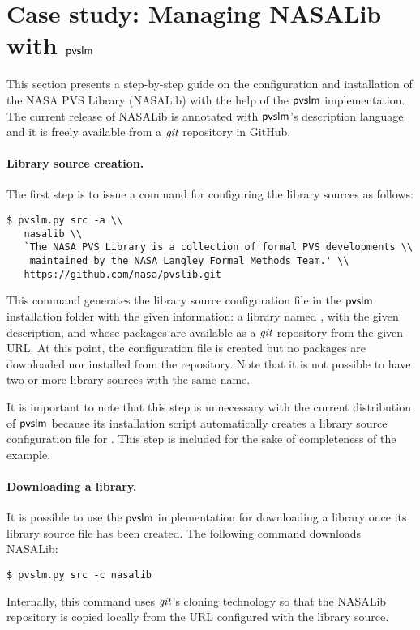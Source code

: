 \section{Case study: Managing NASALib with $\textsf{pvslm}$}
\label{sec.nasalib}

This section presents a step-by-step guide on the configuration and
installation of the NASA PVS Library (NASALib) with the help of the
$\textsf{pvslm}$ implementation. The current release of NASALib is annotated
with $\textsf{pvslm}$'s description language and it is freely available from a
$\textit{git}$ repository in GitHub.

\paragraph{Library source creation.}
The first step is to issue a command for configuring the library sources
as follows:
%
{\small\begin{verbatim}
$ pvslm.py src -a \\
   nasalib \\
   `The NASA PVS Library is a collection of formal PVS developments \\
    maintained by the NASA Langley Formal Methods Team.' \\
   https://github.com/nasa/pvslib.git
\end{verbatim}}
%
\noindent This command generates the library source configuration file
in the $\textsf{pvslm}$ installation folder with the given information: a
library named , with the given description, and whose
packages are available as a $\textit{git}$ repository from the given URL. At
this point, the configuration file is created but no packages are
downloaded nor installed from the repository. Note that it is not
possible to have two or more library sources with the same name.

It is important to note that this step is unnecessary with the current
distribution of $\textsf{pvslm}$ because its installation script automatically
creates a library source configuration file for . This
step is included for the sake of completeness of the example.

\paragraph{Downloading a library.} It is possible to use the $\textsf{pvslm}$
implementation for downloading a library once its library source file
has been created. The following command downloads NASALib:
%
\begin{verbatim}
$ pvslm.py src -c nasalib
\end{verbatim}
%
Internally, this command uses $\textit{git}$'s cloning technology so that the
NASALib repository is copied locally from the URL configured with the
library source.

